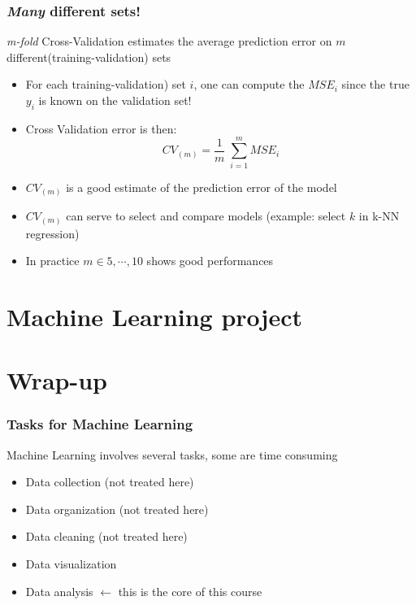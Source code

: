 \documentclass[xcolor=x11names,compress, aspectratio=169]{beamer}
\renewcommand{\(}{\begin{columns}}
\renewcommand{\)}{\end{columns}}
\newcommand{\<}[1]{\begin{column}{#1}}
\renewcommand{\>}{\end{column}}
\begin{document}
\begin{frame}
\frametitle{\textcolor{brique}{\textit{Many} different sets!  }}
\textit{m-fold} Cross-Validation estimates the average prediction error on $m$ different(training-validation) sets
\pause
\begin{itemize}[<+->]
\item For each training-validation) set $i$, one can compute the $MSE_i$ since the true $y_i$ is known on the validation set!
\item Cross Validation error is then:
 $$ CV_{(m)}  =  \frac{1}{m} \; \sum_ {i=1}^m   MSE_i$$
 \item $CV_{(m)}$ is a good estimate of the prediction error of the model
 \item  $CV_{(m)} $  can serve to select and compare models (example: select  $k$ in k-NN regression)
 \item In practice $m \in {5, \cdots, 10}$ shows good performances
\end{itemize}
\end{frame}

\section{Machine Learning project}



\section{Wrap-up}

\begin{frame}
\frametitle{\textcolor{brique}{ Tasks for Machine Learning }}
Machine Learning involves several tasks, some are time consuming
\pause
\begin{itemize}[<+->]
    \item Data collection (not treated here)
    \item Data organization (not treated here)
    \item Data cleaning (not treated here)
    \item Data visualization
    \item Data analysis $ \leftarrow $ this is the core of this course
\end{itemize}
\end{frame}
\end{document}
